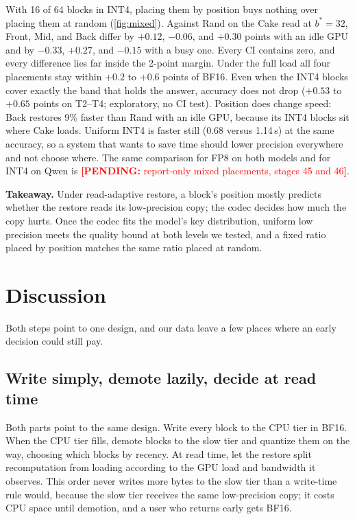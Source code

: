 \documentclass[conference]{IEEEtran}
\newcommand{\cfg}[1]{\textsf{#1}}
\newcommand{\pending}[1]{\textcolor{red}{\textbf{[PENDING:} #1\textbf{]}}}
\begin{document}
With 16 of 64 blocks in INT4, placing them by position buys nothing over placing them at random (\cref{fig:mixed}).
Against \cfg{Rand} on the Cake read at $b^\ast{=}32$, \cfg{Front}, \cfg{Mid}, and \cfg{Back} differ by $+0.12$, $-0.06$, and $+0.30$ points with an idle GPU and by $-0.33$, $+0.27$, and $-0.15$ with a busy one.
Every CI contains zero, and every difference lies far inside the 2-point margin.
Under the full load all four placements stay within $+0.2$ to $+0.6$ points of BF16.
Even when the INT4 blocks cover exactly the band that holds the answer, accuracy does not drop ($+0.53$ to $+0.65$ points on T2--T4; exploratory, no CI test).
Position does change speed: \cfg{Back} restores 9\% faster than \cfg{Rand} with an idle GPU, because its INT4 blocks sit where Cake loads.
Uniform INT4 is faster still (0.68 versus 1.14\,s) at the same accuracy, so a system that wants to save time should lower precision everywhere and not choose where.
The same comparison for FP8 on both models and for INT4 on Qwen is \pending{report-only mixed placements, stages 45 and 46}.

\textbf{Takeaway.}
Under read-adaptive restore, a block's position mostly predicts whether the restore reads its low-precision copy; the codec decides how much the copy hurts.
Once the codec fits the model's key distribution, uniform low precision meets the quality bound at both levels we tested, and a fixed ratio placed by position matches the same ratio placed at random.

\section{Discussion}\label{sec:disc}
Both steps point to one design, and our data leave a few places where an early decision could still pay.

\subsection{Write simply, demote lazily, decide at read time}
Both parts point to the same design.
Write every block to the CPU tier in BF16.
When the CPU tier fills, demote blocks to the slow tier and quantize them on the way, choosing which blocks by recency.
At read time, let the restore split recomputation from loading according to the GPU load and bandwidth it observes.
This order never writes more bytes to the slow tier than a write-time rule would, because the slow tier receives the same low-precision copy; it costs CPU space until demotion, and a user who returns early gets BF16.
\end{document}
